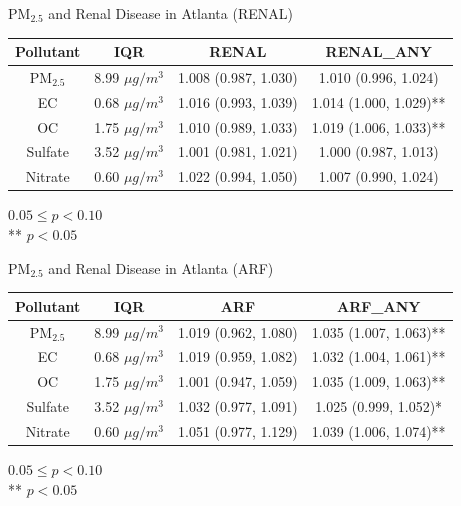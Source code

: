 \documentclass{beamer}
\begin{document}
\begin{frame}{PM$_{2.5}$ and Renal Disease in Atlanta (RENAL)}
    \begin{table}
        \small
        \centering
        \begin{tabular}{c|c|c|c}
            \hline
            Pollutant & IQR & RENAL & RENAL\_ANY \\
            \hline
            PM$_{2.5}$ & 8.99 $\mu g/m^3$ & 1.008 (0.987, 1.030) & 1.010 (0.996, 1.024) \\
            EC & 0.68 $\mu g/m^3$ & 1.016 (0.993, 1.039) & 1.014 (1.000, 1.029)** \\
            OC & 1.75 $\mu g/m^3$ & 1.010 (0.989, 1.033) & 1.019 (1.006, 1.033)** \\
            Sulfate & 3.52 $\mu g/m^3$ & 1.001 (0.981, 1.021) & 1.000 (0.987, 1.013) \\
            Nitrate & 0.60 $\mu g/m^3$ & 1.022 (0.994, 1.050) & 1.007 (0.990, 1.024) \\
            \hline
        \end{tabular}
    \end{table}
    {\footnotesize * $0.05 \leq p < 0.10$ \\ ** $p < 0.05$}
\end{frame}

\begin{frame}{PM$_{2.5}$ and Renal Disease in Atlanta (ARF)}
    \begin{table}
        \small
        \centering
        \begin{tabular}{c|c|c|c}
            \hline
            Pollutant & IQR & ARF & ARF\_ANY \\
            \hline
            PM$_{2.5}$ & 8.99 $\mu g/m^3$ & 1.019 (0.962, 1.080) & 1.035 (1.007, 1.063)** \\
            EC & 0.68 $\mu g/m^3$ & 1.019 (0.959, 1.082) & 1.032 (1.004, 1.061)** \\
            OC & 1.75 $\mu g/m^3$ & 1.001 (0.947, 1.059) & 1.035 (1.009, 1.063)** \\
            Sulfate & 3.52 $\mu g/m^3$ & 1.032 (0.977, 1.091) & 1.025 (0.999, 1.052)* \\
            Nitrate & 0.60 $\mu g/m^3$ & 1.051 (0.977, 1.129) & 1.039 (1.006, 1.074)** \\
            \hline
        \end{tabular}
    \end{table}
    {\footnotesize * $0.05 \leq p < 0.10$ \\ ** $p < 0.05$}
\end{frame}
\end{document}
